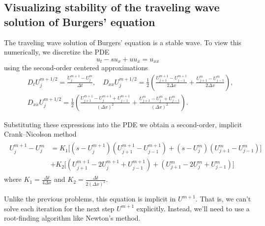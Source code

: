 \subsection*{Visualizing stability of the traveling wave solution of Burgers' equation}
The traveling wave solution of Burgers' equation is a stable wave.
To view this numerically, we discretize the PDE
\[u_t -su_x + uu_x = u_{xx}\]
using the second-order centered approximations
\begin{align*}
&{ } D_t U_j^{m+1/2} = \frac{U_j^{m+1}-U_j^m}{\Delta t}, \quad
D_{xx}U_j^{m+1/2} = \frac{1}{2} \left( \frac{U_{j+1}^{m+1}-U_{j-1}^{m+1}}{2 \Delta x} +  \frac{U_{j+1}^{m}-U_{j-1}^{m}}{2 \Delta x}\right),\\
&{ } D_{xx}U_j^{m+1/2} = \frac{1}{2} \left( \frac{U_{j+1}^{m+1}- U_{j}^{m+1}+U_{j-1}^{m+1}}{(\Delta x)^2} + \frac{U_{j+1}^{m}- U_{j}^{m}+U_{j-1}^{m}}{(\Delta x)^2}\right).
\end{align*}

Substituting these expressions into the PDE we obtain a second-order, implicit Crank--Nicolson method
\begin{align}
\begin{split}
\label{waveeqn:eqn:crank-nicolson}
U_j^{m+1} - U_j^m &= K_1 \big[(s - U_j^{m+1})(U_{j+1}^{m+1} - U_{j-1}^{m+1})
+ (s - U_j^m) (U_{j+1}^m - U_{j-1}^m) \big] \\
&+ K_2 \big[(U_{j+1}^{m+1} - 2U_j^{m+1}+ U_{j-1}^{m+1}) + (U_{j+1}^m -2U_j^m + U_{j-1}^m) \big]
\end{split}
\end{align}
where $K_1 = \frac{ \Delta t }{4 \Delta x}$ and $K_2 = \frac{ \Delta t}{2(\Delta x)^2}$.

Unlike the previous problems, this equation is implicit in $U^{m+1}$.
That is, we can't solve each iteration for the next step $U^{m+1}$ explicitly.
Instead, we'll need to use a root-finding algorithm like Newton's method.

